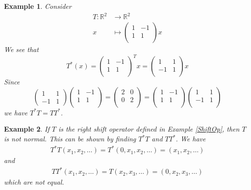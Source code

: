 \documentclass{report}
\newtheorem{exm}{Example}
\begin{document}
\begin{exm}
  Consider
  $$
  \begin{aligned}
    T:\mathbb{R}^{2}&\longrightarrow\mathbb{R}^{2}\\
    x&\longmapsto\begin{pmatrix}1&-1\\1&1\\\end{pmatrix}x
  \end{aligned}
  $$
  We see that
  $$
    T^{*}(x) = \begin{pmatrix}1&-1\\1&1\\\end{pmatrix}^{T}x = \begin{pmatrix}1&1\\-1&1\\\end{pmatrix}x
  $$
  Since
  $$
    \begin{pmatrix}1&1\\-1&1\end{pmatrix}\begin{pmatrix}1&-1\\1&1\\\end{pmatrix} = \begin{pmatrix}2&0\\0&2\\\end{pmatrix} = \begin{pmatrix}1&-1\\1&1\\\end{pmatrix}\begin{pmatrix}1&1\\-1&1\\\end{pmatrix}
  $$
  we have $T^{*}T=TT^{*}$.
\end{exm}

\begin{exm}
  If $T$ is the right shift operator defined in Example \ref{ShiftOp}, then $T$ is not normal. This can be shown by finding $T^{*}T$ and $TT^{*}$. We have
  $$
  \begin{aligned}
    T^{*}T(x_{1},x_{2},\dots) = T^{*}(0,x_{1},x_{2},\dots) = (x_{1},x_{2},\dots)
  \end{aligned}
  $$
  and
  $$
  \begin{aligned}
    TT^{*}(x_{1},x_{2},\dots) = T(x_{2},x_{3},\dots) = (0,x_{2},x_{3},\dots)
  \end{aligned}
  $$
  which are not equal.
\end{exm}
\end{document}
